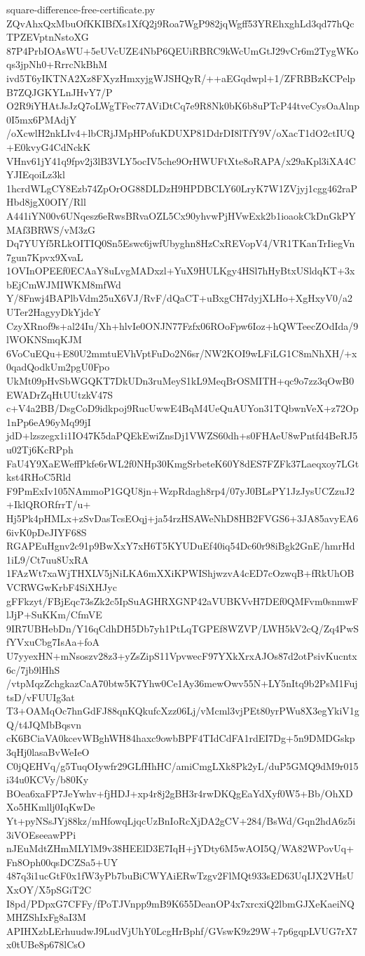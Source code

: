 \documentclass[11pt]{article}
\theoremstyle{definition}
\theoremstyle{remark}
\begin{document}
\begin{filecontents*}[overwrite]{square-difference-free-certificate.py}
ZQvAhxQxMbuOfKKIBfXs1XfQ2j9Roa7WgP982jqWgff53YREhxghLd3qd77hQcTPZEVptnNstoXG
87P4PrbIOAsWU+5eUVcUZE4NbP6QEUiRBRC9kWcUmGtJ29vCr6m2TygWKoqs3jpNh0+RrrcNkBhM
ivd5T6yIKTNA2Xz8FXyzHmxyjgWJSHQyR/++aEGqdwpl+1/ZFRBBzKCPelpB7ZQJGKYLnJHvY7/P
O2R9iYHAtJsJzQ7oLWgTFec77AViDtCq7e9R8Nk0bK6b8uPTcP44tveCysOaAlnp0I5mx6PMAdjY
/oXcwlH2nkLIv4+lbCRjJMpHPofuKDUXP81DdrDI8lTfY9V/oXacT1dO2ctIUQ+E0kvyG4CdNckK
VHnv61jY41q9fpv2j3lB3VLY5ocIV5che9OrHWUFtXte8oRAPA/x29aKpl3iXA4CYJIEqoiLz3kl
1hcrdWLgCY8Ezb74ZpOrOG88DLDzH9HPDBCLY60LryK7W1ZVjyj1cgg462raPHbd8jgX0OIY/Rll
A441iYN00v6UNqesz6eRwsBRvaOZL5Cx90yhvwPjHVwExk2b1ioaokCkDnGkPYMAf3BRWS/vM3zG
Dq7YUYf5RLkOITIQ0Sn5Eswc6jwfUbyghn8HzCxREVopV4/VR1TKanTrIiegVn7gun7Kpvx9XvaL
1OVInOPEEf0ECAaY8uLvgMADxzl+YuX9HULKgy4HSl7hHyBtxUSldqKT+3xbEjCmWJMIWKM8mfWd
Y/8Fnwj4BAPlbVdm25uX6VJ/RvF/dQaCT+uBxgCH7dyjXLHo+XgHxyV0/a2UTer2HagyyDkYjdcY
CzyXRnof9s+al24Iu/Xh+hlvIe0ONJN77Fzfx06ROoFpw6Ioz+hQWTeecZOdIda/9lWOKNSmqKJM
6VoCuEQu+E80U2mmtuEVhVptFuDo2N6sr/NW2KOI9wLFiLG1C8mNhXH/+x0qadQodkUm2pgU0Fpo
UkMt09pHvSbWGQKT7DkUDn3ruMeyS1kL9MeqBrOSMITH+qc9o7zz3qOwB0EWADrZqHtUUtzkV47S
c+V4a2BB/DsgCoD9idkpoj9RucUwwE4BqM4UeQuAUYon31TQbwnVeX+z72Op1nPp6eA96yMq99jI
jdD+lzszegx1i1IO47K5daPQEkEwiZnsDj1VWZS60dh+s0FHAeU8wPntfd4BeRJ5u02Tj6KcRPph
FaU4Y9XaEWeffPkfe6rWL2f0NHp30KmgSrbeteK60Y8dES7FZFk37Laeqxoy7LGtkst4RHoC5Rld
F9PmExIv105NAmmoP1GQU8jn+WzpRdagh8rp4/07yJ0BLsPY1JzJysUCZzuJ2+IklQRORfrrT/u+
Hj5Pk4pHMLx+zSvDasTcsEOqj+ja54rzHSAWeNhD8HB2FVGS6+3JA85avyEA66ivK0pDeJIYF68S
RGAPEuHgnv2c91p9BwXxY7xH6T5KYUDuEf40iq54Dc60r98iBgk2GnE/hmrHd1iL9/Ct7uu8UxRA
1FAzWt7xaWjTHXLV5jNiLKA6mXXiKPWIShjwzvA4cED7cOzwqB+fRkUhOBVCRWGwKrbF4SiXHJyc
gFFkzyt/FBjEqc73sZk2c5IpSuAGHRXGNP42aVUBKVvH7DEf0QMFvm0snmwFlJjP+SuKKm/CfmVE
9IR7UBHebDn/Y16qCdhDH5Db7yh1PtLqTGPEf8WZVP/LWH5kV2cQ/Zq4PwSfYVxuCbg7IsAa+foA
U7yyexHN+mNsoszv28z3+yZsZipS11VpvwecF97YXkXrxAJOs87d2otPsivKucntx6c/7jb9lHhS
/vtpMqzZchgkazCaA70btw5K7Yhw0Ce1Ay36mewOwv55N+LY5nItq9b2PsM1FujtsD/vFUUIg3at
T3+OAMqOc7hnGdFJ88qnKQkufcXzz06Lj/vMcml3vjPEt80yrPWu8X3egYkiV1gQ/t4JQMbBqsvn
cK6BCiaVA0kcevWBghWH84haxc9owbBPF4TIdCdFA1rdEI7Dg+5n9DMDGskp3qHj0lasaBvWeIeO
C0jQEHVq/g5TuqOIywfr29GLfHhHC/amiCmgLXk8Pk2yL/duP5GMQ9dM9r015i34u0KCVy/b80Ky
BOea6xaFP7JeYwhv+fjHDJ+xp4r8j2gBH3r4rwDKQgEaYdXyf0W5+Bb/OhXDXo5HKmllj0IqKwDe
Yt+pyNSsJYj88kz/mHfowqLjqcUzBnIoRcXjDA2gCV+284/BsWd/Gqn2hdA6z5i3iVOEseeawPPi
nJEuMdtZHmMLYlM9v38HEElD3E7IqH+jYDty6M5wAOI5Q/WA82WPovUq+Fn8Oph00qsDCZSa5+UY
487q3i1ucGtF0x1fW3yPb7buBiCWYAiERwTzgv2FlMQt933sED63UqIJX2VHsUXxOY/X5pSGiT2C
I8pd/PDpxG7CFFy/fPoTJVnpp9mB9K655DeanOP4x7xrcxiQ2lbmGJXeKaeiNQMHZShIxFg8aI3M
APIHXzbLErhuudwJ9LudVjUhY0LcgHrBphf/GVswK9z29W+7p6gqpLVUG7rX7x0tUBe8p678lCsO

\end{filecontents*}
\end{document}
